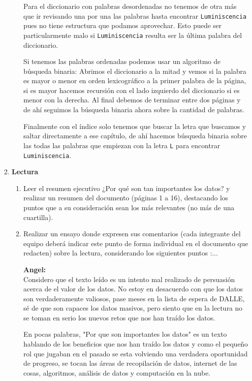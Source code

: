 \documentclass[11pt,letterpaper]{article}
\begin{document}
\begin{enumerate}
\begin{enumerate}
				Para el diccionario con palabras desordenadas no tenemos de otra más que ir revisando una por una
				las palabras hasta encontrar \texttt{Luminiscencia} pues no tiene estructura que podamos aprovechar.
				Esto puede ser particularmente malo si \texttt{Luminiscencia} resulta ser la última palabra del diccionario.

				Si tenemos las palabras ordenadas podemos usar un algoritmo de búsqueda binaria:
				Abrimos el diccionario a la mitad y vemos si la palabra es mayor o menor en orden
				lexicográfico a la primer palabra de la página, si es mayor hacemos recursión con el lado izquierdo
				del diccionario si es menor con la derecha.
				Al final debemos de terminar entre dos páginas y de ahí seguimos la búsqueda binaria ahora
				sobre la cantidad de palabras.

				Finalmente con el índice solo tenemos que buscar la letra que buscamos y saltar directamente a
				ese capítulo, de ahí hacemos búsqueda binaria sobre las todas las palabras que
				empiezan con la letra \texttt{L} para encontrar \texttt{Luminiscencia}.

		\end{enumerate}

	\item \textbf{Lectura}
		\begin{enumerate}
			\item Leer el resumen ejecutivo ¿Por qué son tan importantes los datos? y realizar un resumen del documento
				(páginas 1 a 16), destacando los puntos que a su consideración sean los más relevantes (no más de
				una cuartilla).

			\item Realizar un ensayo donde expresen sus comentarios (cada integrante del equipo deberá indicar este
				punto de forma individual en el documento que redacten) sobre la lectura, considerando los siguientes puntos :...

				\textbf{Angel:}\\
				Considero que el texto leído es un intento mal realizado de
				persuasión acerca de el valor de los datos.
				No estoy en desacuerdo con que los datos son verdaderamente
				valiosos, pase meses en la lista de espera de DALLE, sé
				de que son capaces los datos masivos, pero siento que
				en la lectura no se toman en serio los nuevos retos
				que nos han traído los datos.

				En pocas palabras, "Por que son importantes los datos"
				es un texto hablando de los beneficios que nos han traído los
				datos y como el pequeño rol que jugaban en el pasado
				se esta volviendo una verdadera oportunidad de progreso,
				se tocan las áreas de recopilación de datos, internet de las cosas,
				algoritmos, análisis de datos y computación en la nube. 


\end{enumerate}
\end{enumerate}
\end{document}
